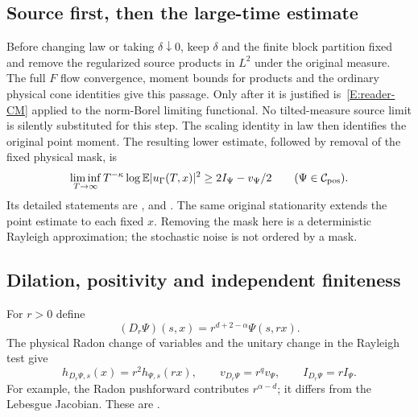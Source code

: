\subsection{Source first, then the large-time estimate}

Before changing law or taking $\delta\downarrow0$, keep $\delta$ and the finite
block partition fixed and remove the regularized source products in $L^2$ under
the original measure. The full $F$ flow convergence, moment bounds for products
and the ordinary physical cone identities give this passage. Only after it is
justified is~\eqref{E:reader-CM} applied to the norm-Borel limiting functional.
No tilted-measure source limit is silently substituted for this step. The
scaling identity in law then identifies the original point moment. The resulting
lower estimate, followed by removal of the fixed physical mask, is
\begin{equation}\label{E:reader-lower}
  \liminf_{T\to\infty}T^{-\kappa}\log\mathbb E|u_\Gamma(T,x)|^2
  \ge2I_\Psi-v_\Psi/2\qquad(\Psi\in\mathcal C_{\mathrm{pos}}).
\end{equation}
Its detailed statements are ,
 and . The same
original stationarity extends the point estimate to each fixed $x$. Removing the
mask here is a deterministic Rayleigh approximation; the stochastic noise is not
ordered by a mask.

\subsection{Dilation, positivity and independent finiteness}

For $r > 0$ define
\begin{equation}\label{E:reader-dilation}
  (D_r\Psi)(s,x)=r^{d+2-\alpha}\Psi(s,rx).
\end{equation}
The physical Radon change of variables and the unitary change in the Rayleigh
test give
\begin{equation}\label{E:reader-dilation-values}
  h_{D_r\Psi,s}(x)=r^2h_{\Psi,s}(rx),\qquad
  v_{D_r\Psi}=r^qv_\Psi,\qquad I_{D_r\Psi}=rI_\Psi.
\end{equation}
For example, the Radon pushforward contributes $r^{\alpha-d}$; it differs from
the Lebesgue Jacobian. These are .


